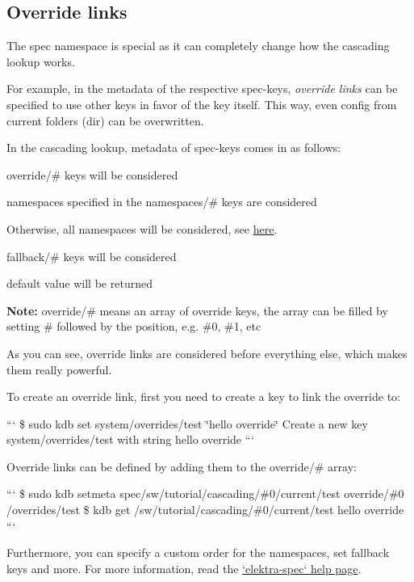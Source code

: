 \subsection*{Override links}

The {\ttfamily spec} namespace is special as it can completely change how the cascading lookup works.

For example, in the metadata of the respective {\ttfamily spec}-\/keys, {\itshape override links} can be specified to use other keys in favor of the key itself. This way, even config from current folders ({\ttfamily dir}) can be overwritten.

In the cascading lookup, metadata of {\ttfamily spec}-\/keys comes in as follows\+:


\begin{DoxyEnumerate}
\item {\ttfamily override/\#} keys will be considered
\item namespaces specified in the {\ttfamily namespaces/\#} keys are considered
\item Otherwise, all namespaces will be considered, see \hyperlink{md_doc_help_elektra-namespaces_doc_help_elektra-namespaces_md}{here}.
\item {\ttfamily fallback/\#} keys will be considered
\item {\ttfamily default} value will be returned
\end{DoxyEnumerate}

{\bfseries Note\+:} {\ttfamily override/\#} means an array of {\ttfamily override} keys, the array can be filled by setting {\ttfamily \#} followed by the position, e.\+g. {\ttfamily \#0}, {\ttfamily \#1}, etc

As you can see, override links are considered before everything else, which makes them really powerful.

To create an override link, first you need to create a key to link the override to\+:

``` \$ sudo kdb set system/overrides/test \char`\"{}hello override\char`\"{} Create a new key system/overrides/test with string hello override ```

Override links can be defined by adding them to the {\ttfamily override/\#} array\+:

``` \$ sudo kdb setmeta spec/sw/tutorial/cascading/\#0/current/test override/\#0 /overrides/test \$ kdb get /sw/tutorial/cascading/\#0/current/test hello override ```

Furthermore, you can specify a custom order for the namespaces, set fallback keys and more. For more information, read the \hyperlink{md_doc_help_elektra-spec_doc_help_elektra-spec_md}{`elektra-\/spec` help page}.


